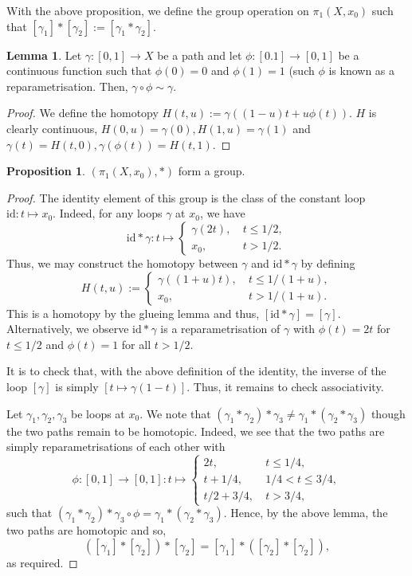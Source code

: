 \documentclass[]{article}
\theoremstyle{definition}
\theoremstyle{definition}
\newtheorem{lemma}{Lemma}[section]
\newtheorem{proposition}{Proposition}[section]
\begin{document}
With the above proposition, we define the group operation on \(\pi_1(X, x_0)\) 
such that \([\gamma_1] * [\gamma_2] := [\gamma_1 * \gamma_2]\).

\begin{lemma}
  Let \(\gamma : [0, 1] \to X\) be a path and let \(\phi : [0. 1] \to [0, 1]\) be 
  a continuous function such that \(\phi(0) = 0\) and \(\phi(1) = 1\) (such \(\phi\) is known 
  as a reparametrisation. Then, \(\gamma \circ \phi \sim \gamma\). 
\end{lemma}
\begin{proof}
  We define the homotopy \(H(t, u) := \gamma((1 - u)t + u\phi(t))\). \(H\) is 
  clearly continuous, \(H(0, u) = \gamma(0), H(1, u) = \gamma(1)\) and 
  \(\gamma(t) = H(t, 0), \gamma(\phi(t)) = H(t, 1)\).
\end{proof}

\begin{proposition}
  \((\pi_1(X, x_0), *)\) form a group.
\end{proposition}
\begin{proof}
  The identity element of this group is the class of the constant loop \(\text{id} : t \mapsto x_0\). 
  Indeed, for any loops \(\gamma\) at \(x_0\), we have 
  \[\text{id} * \gamma : t \mapsto \begin{cases}
    \gamma(2t), \ & t \le 1 / 2,\\
    x_0, \ & t > 1 / 2. 
  \end{cases}\]
  Thus, we may construct the homotopy between \(\gamma\) and \(\text{id} * \gamma\) by 
  defining 
  \[H(t, u) := \begin{cases}
    \gamma((1 + u)t), \ & t \le 1 / (1 + u),\\
    x_0, \ & t > 1 / (1 + u).
  \end{cases}\]
  This is a homotopy by the glueing lemma and thus, \([\text{id} * \gamma] = [\gamma]\).
  Alternatively, we observe \(\text{id} * \gamma\) is a reparametrisation of \(\gamma\) 
  with \(\phi(t) = 2t\) for \(t \le 1 / 2\) and \(\phi(t) = 1\) for all \(t > 1 / 2\).

  It is to check that, with the above definition of the identity, the inverse of the 
  loop \([\gamma]\) is simply \([t \mapsto \gamma(1 - t)]\). Thus, it remains to 
  check associativity.

  Let \(\gamma_1, \gamma_2, \gamma_3\) be loops at \(x_0\). We note that 
  \((\gamma_1 * \gamma_2) * \gamma_3 \neq \gamma_1 * (\gamma_2 * \gamma_3)\) though 
  the two paths remain to be homotopic. Indeed, we see that the two paths are 
  simply reparametrisations of each other with 
  \[\phi : [0, 1] \to [0, 1] : t \mapsto \begin{cases}
    2t, \ & t \le 1 / 4,\\
    t + 1 / 4, \ & 1 / 4 < t \le 3 / 4,\\
    t / 2 + 3 / 4, \ & t > 3 / 4,
  \end{cases}\] 
  such that \((\gamma_1 * \gamma_2) * \gamma_3 \circ \phi = \gamma_1 * (\gamma_2 * \gamma_3)\). 
  Hence, by the above lemma, the two paths are homotopic and so, 
  \[([\gamma_1] * [\gamma_2]) * [\gamma_2] = [\gamma_1] * ([\gamma_2] * [\gamma_2]),\]
  as required.
\end{proof}
\end{document}
